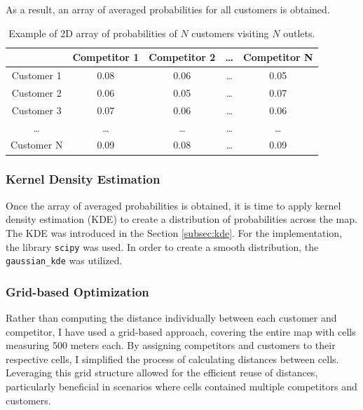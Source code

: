 As a result, an array of averaged probabilities for all customers is obtained.

\begin{table}[htbp]
    \centering
    \begin{tabular}{|c|c|c|c|c|}
    \hline
     & \textbf{Competitor 1} & \textbf{Competitor 2} & \textbf{\dots} & \textbf{Competitor N} \\
    \hline
    Customer 1 & 0.08 & 0.06 & \dots & 0.05 \\
    Customer 2 & 0.06 & 0.05 & \dots & 0.07 \\
    Customer 3 & 0.07 & 0.06 & \dots & 0.06 \\
    \dots & \dots & \dots & \dots & \dots \\
    Customer N & 0.09 & 0.08 & \dots & 0.09 \\
    \hline
    \end{tabular}
    \caption{Example of 2D array of probabilities of $N$ customers visiting $N$ outlets.}
    \label{tab:customerCompetitorProbability}
\end{table}

\subsubsection{Kernel Density Estimation}

Once the array of averaged probabilities is obtained, it is time to apply kernel density estimation (KDE) to create a distribution of probabilities across the map. The KDE was introduced in the Section \ref{subsec:kde}. For the implementation, the library \texttt{scipy} was used. In order to create a smooth distribution, the \texttt{gaussian\_kde} was utilized.

\subsubsection{Grid-based Optimization}
\label{subsec:gridBasedOptimization}

Rather than computing the distance individually between each customer and competitor, I have used a grid-based approach, covering the entire map with cells measuring 500 meters each. By assigning competitors and customers to their respective cells, I simplified the process of calculating distances between cells. Leveraging this grid structure allowed for the efficient reuse of distances, particularly beneficial in scenarios where cells contained multiple competitors and customers.

